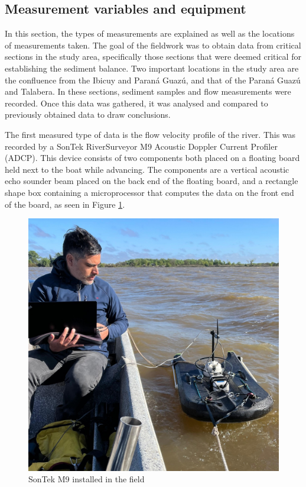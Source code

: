 
\subsection{Measurement variables and equipment}
\label{Measurement variables and equipment}
In this section, the types of measurements are explained as well as the locations of measurements taken. The goal of the fieldwork was to obtain data from critical sections in the study area, specifically those sections that were deemed critical for establishing the sediment balance. Two important locations in the study area are the confluence from the Ibicuy and Paraná Guazú, and that of the Paraná Guazú and Talabera. In these sections, sediment samples and flow measurements were recorded. Once this data was gathered, it was analysed and compared to previously obtained data to draw conclusions. 



The first measured type of data is the flow velocity profile of the river. This was recorded by a SonTek RiverSurveyor M9 Acoustic Doppler Current Profiler (ADCP). This device consists of two components both placed on a floating board held next to the boat while advancing. The components are a vertical acoustic echo sounder beam placed on the back end of the floating board, and a rectangle shape box containing a microprocessor that computes the data on the front end of the board, as seen in Figure \ref{fig:SonTekmeasurement}.

\begin{figure}[H]
    \centering
    \includegraphics[width=0.5\linewidth]{figures/ch4/sonteknico.jpg}
    \caption{SonTek M9 installed in the field}
    \label{fig:SonTekmeasurement}
\end{figure}

